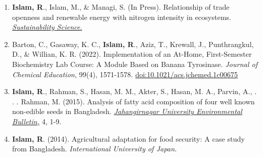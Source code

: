 \documentclass[10pt]{article}
\begin{document}
\spacedhrule{0.8ex}{0.0ex}

\begin{enumerate}
    \item \textbf{Islam, R}., Islam, M., \& Managi, S. (In Press). Relationship of trade openness and renewable energy with nitrogen intensity in ecosystems. \href{https://link.springer.com/journal/11625}{\textit{Sustainability Science}.}
    \item Barton, C., Gasaway, K. C., \textbf{Islam, R}., Aziz, T., Krewall, J., Punthrangkul, D., \& Willian, K. R. (2022). Implementation of an At-Home, First-Semester Biochemistry Lab Course: A Module Based on Banana Tyrosinase. \textit{Journal of Chemical Education}, 99(4), 1571-1578. \href{https://doi.org/10.1021/acs.jchemed.1c00675}{doi:10.1021/acs.jchemed.1c00675}
    \item \textbf{Islam, R}., Rahman, S., Hasan, M. M., Akter, S., Hasan, M. A., Parvin, A., . . . Rahman, M. (2015). Analysis of fatty acid composition of four well known non-edible seeds in Bangladesh. \href{https://www.researchgate.net/publication/303100510_Analysis_of_fatty_acid_composition_of_four_well_known_non-edible_seeds_in_Bangladesh}{\textit{Jahangirnagar University Environmental Bulletin,}} 4, 1-9.
    \item \textbf{Islam, R}. (2014). Agricultural adaptation for food security: A case study from Bangladesh. \textit{International University of Japan}.
\end{enumerate}

\spacedhrule{0.8ex}{0.0ex}
\end{document}
